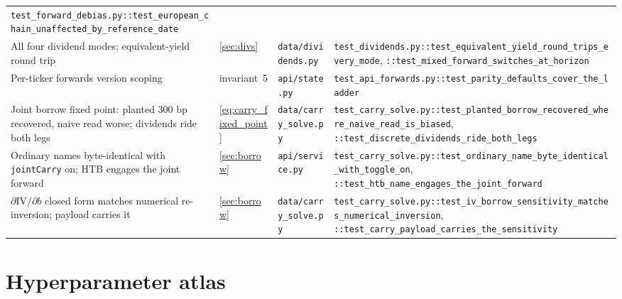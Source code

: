 \documentclass[11pt]{article}
\begin{document}
\begin{longtable}{@{}p{}p{}p{}p{}@{}}
\nolinkurl{test_forward_debias.py::test_european_chain_unaffected_by_reference_date}\\
All four dividend modes; equivalent-yield round trip &
\cref{sec:divs} &
\nolinkurl{data/dividends.py} &
\nolinkurl{test_dividends.py::test_equivalent_yield_round_trips_every_mode}, \nolinkurl{::test_mixed_forward_switches_at_horizon}\\
Per-ticker forwards version scoping &
invariant~5 &
\nolinkurl{api/state.py} &
\nolinkurl{test_api_forwards.py::test_parity_defaults_cover_the_ladder}\\
\addlinespace
Joint borrow fixed point: planted $300$ bp recovered, naive read worse;
dividends ride both legs &
\eqref{eq:carry_fixed_point} &
\nolinkurl{data/carry_solve.py} &
\nolinkurl{test_carry_solve.py::test_planted_borrow_recovered_where_naive_read_is_biased},
\nolinkurl{::test_discrete_dividends_ride_both_legs}\\
Ordinary names byte-identical with \texttt{jointCarry} on; HTB engages the
joint forward &
\cref{sec:borrow} &
\nolinkurl{api/service.py} &
\nolinkurl{test_carry_solve.py::test_ordinary_name_byte_identical_with_toggle_on},
\nolinkurl{::test_htb_name_engages_the_joint_forward}\\
$\partial\text{IV}/\partial b$ closed form matches numerical re-inversion;
payload carries it &
\cref{sec:borrow} &
\nolinkurl{data/carry_solve.py} &
\nolinkurl{test_carry_solve.py::test_iv_borrow_sensitivity_matches_numerical_inversion},
\nolinkurl{::test_carry_payload_carries_the_sensitivity}\\
\bottomrule
\end{longtable}
\endgroup

\appendix
\section{Hyperparameter atlas}
\label{app:atlas}
\end{document}
